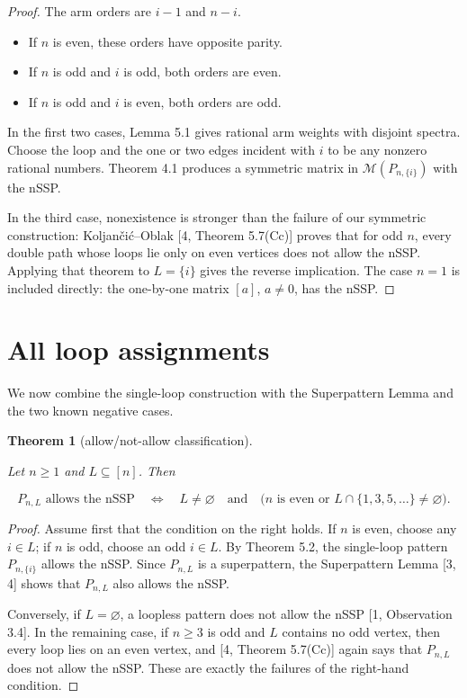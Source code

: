 \documentclass[11pt]{article}
\newtheorem{theorem}{Theorem}[section]
\theoremstyle{remark}
\begin{document}
\begin{proof}

The arm orders are $i-1$ and $n-i$.

\begin{itemize}
\item If $n$ is even, these orders have opposite parity.
\item If $n$ is odd and $i$ is odd, both orders are even.
\item If $n$ is odd and $i$ is even, both orders are odd.
\end{itemize}
In the first two cases, Lemma 5.1 gives rational arm weights with disjoint spectra. Choose the loop and
the one or two edges incident with $i$ to be any nonzero rational numbers. Theorem 4.1 produces a
symmetric matrix in $\mathcal M(P_{n,\{i\}})$ with the nSSP.

In the third case, nonexistence is stronger than the failure of our symmetric construction:
Koljan\v{c}i\'{c}--Oblak [4, Theorem 5.7(Cc)] proves that for odd $n$, every double path whose loops lie only
on even vertices does not allow the nSSP. Applying that theorem to $L=\{i\}$ gives the reverse
implication. The case $n=1$ is included directly: the one-by-one matrix $[a]$, $a\neq0$, has the
nSSP. \qedhere

\end{proof}

\section{All loop assignments}


We now combine the single-loop construction with the Superpattern Lemma and the two known negative
cases.

\begin{theorem}[allow/not-allow classification]
\label{theorem:6-1}

Let $n\geq1$ and $L\subseteq[n]$. Then

\[
  P_{n,L}\text{ allows the nSSP}
  \quad\Longleftrightarrow\quad
  L\neq\varnothing
  \quad\text{and}\quad
  \bigl(n\text{ is even or }L\cap\{1,3,5,\ldots\}\neq\varnothing\bigr). \tag{6.1}
\]

\end{theorem}

\begin{proof}

Assume first that the condition on the right holds. If $n$ is even, choose any $i\in L$; if
$n$ is odd, choose an odd $i\in L$. By Theorem 5.2, the single-loop pattern
$P_{n,\{i\}}$ allows the nSSP. Since $P_{n,L}$ is a superpattern, the Superpattern Lemma
[3, 4] shows that $P_{n,L}$ also allows the nSSP.

Conversely, if $L=\varnothing$, a loopless pattern does not allow the nSSP
[1, Observation 3.4]. In the remaining case, if $n\geq3$ is odd and $L$ contains no odd vertex, then
every loop lies on an even vertex, and [4, Theorem 5.7(Cc)] again says that $P_{n,L}$ does not allow the
nSSP. These are exactly the failures of the right-hand condition. \qedhere

\end{proof}
\end{document}
